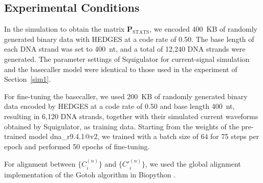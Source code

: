 \documentclass[sotsuron]{kuee}
\begin{document}
\subsection{Experimental Conditions}
In the simulation to obtain the matrix $\bm{P}_{\mathrm{STATS}}$, we encoded 400~KB of randomly
generated binary data with HEDGES at a code rate of 0.50.
The base length of each DNA strand was set to 400~nt, and a total of 12,240 DNA strands were
generated.
The parameter settings of Squigulator for current-signal simulation and the basecaller model
were identical to those used in the experiment of Section~\ref{sim1}.

For fine-tuning the basecaller, we used 200~KB of randomly generated binary data encoded by
HEDGES at a code rate of 0.50 and base length 400~nt, resulting in 6,120 DNA strands, together
with their simulated current waveforms obtained by Squigulator, as training data.
Starting from the weights of the pre-trained model dna\_r9.4.1@v2, we trained with a batch size
of 64 for 75 steps per epoch and performed 50 epochs of fine-tuning.

For alignment between $\{C^{(n)}_i\}$ and $\{C'^{(n)}_i\}$, we used the global alignment
implementation of the Gotoh algorithm in Biopython
\cite{biopython,GOTOH1982705}.
\end{document}
